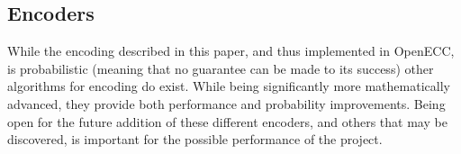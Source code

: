 \subsection{Encoders}
\label{sec:implementation_encoding}

While the encoding described in this paper, and thus implemented in OpenECC, is probabilistic (meaning that no
guarantee can be made to its success) other algorithms for encoding do exist. While being significantly more
mathematically advanced, they provide both performance and probability improvements.\cite{MappingAMessage}
Being open for the future addition of these different encoders, and others that may be discovered, is important
for the possible performance of the project.